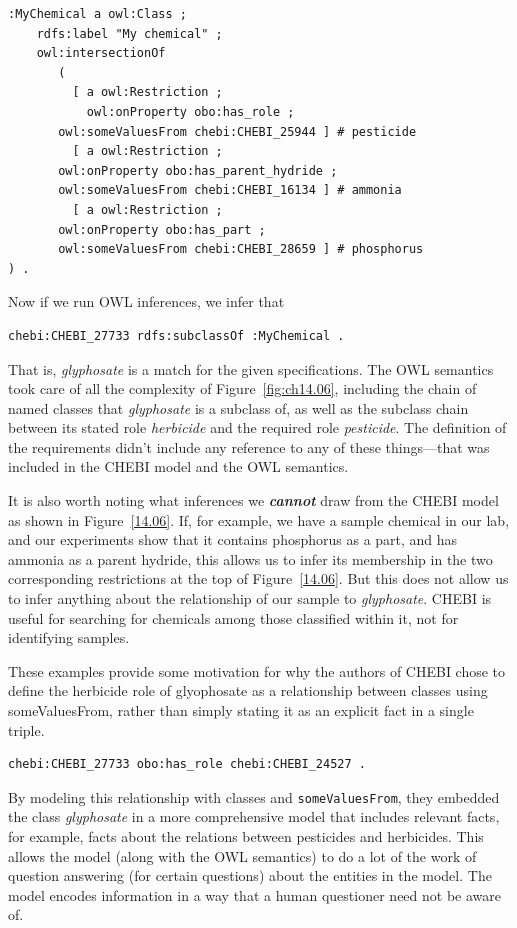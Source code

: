 \begin{lstlisting}
:MyChemical a owl:Class ;
    rdfs:label "My chemical" ;
    owl:intersectionOf
       (
         [ a owl:Restriction ;
           owl:onProperty obo:has_role ;
	   owl:someValuesFrom chebi:CHEBI_25944 ] # pesticide
         [ a owl:Restriction ;
	   owl:onProperty obo:has_parent_hydride ;
	   owl:someValuesFrom chebi:CHEBI_16134 ] # ammonia
         [ a owl:Restriction ;
	   owl:onProperty obo:has_part ;
	   owl:someValuesFrom chebi:CHEBI_28659 ] # phosphorus
) .
\end{lstlisting}

Now if we run OWL inferences, we infer that

\begin{lstlisting}
chebi:CHEBI_27733 rdfs:subclassOf :MyChemical .
\end{lstlisting}

That is, \textit{glyphosate} is a match for the given specifications. The OWL
semantics took care of all the complexity of Figure~\ref{fig:ch14.06}, including the
chain of named classes that \textit{glyphosate} is a subclass of, as well as the
subclass chain between its stated role \textit{herbicide} and the required role
\textit{pesticide}. The definition of the requirements didn't include any
reference to any of these things---that was included in the CHEBI model
and the OWL semantics.

It is also worth noting what inferences we \textbf{\textit{cannot}} draw from the CHEBI
model as shown in Figure~\ref{14.06}. If, for example, we have a sample
chemical in our lab, and our experiments show that it contains
phosphorus as a part, and has ammonia as a parent hydride, this allows
us to infer its membership in the two corresponding restrictions at the
top of Figure~\ref{14.06}. But this does not allow us to infer anything about
the relationship of our sample to \textit{glyphosate}. CHEBI is useful for
searching for chemicals among those classified within it, not for
identifying samples.

These examples provide some motivation for why the authors of CHEBI
chose to define the
herbicide role of glyophosate as a relationship between classes using
someValuesFrom, rather than simply stating it as an explicit fact in a
single triple.

\begin{lstlisting}
chebi:CHEBI_27733 obo:has_role chebi:CHEBI_24527 .
\end{lstlisting}

By modeling this relationship with classes and \texttt{someValuesFrom}, they
embedded the class \textit{glyphosate} in a more comprehensive model that
includes relevant facts, for example, facts about the relations between
pesticides and herbicides. This allows the model (along with the OWL
semantics) to do a lot of the work of question answering (for certain
questions) about the entities in the model. The model encodes
information in a way that a human questioner need not be aware of.

